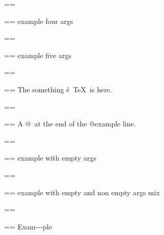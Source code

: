 \documentclass{book}
\makeatletter
\newenvironment{Texinfopreformatted}{%
  \par\GNUTobeylines\obeyspaces\frenchspacing\parskip=\z@\parindent=\z@}{}
{\catcode`\^^M=13 \gdef\GNUTobeylines{\catcode`\^^M=13 \def^^M{\null\par}}}
\newenvironment{Texinfoindented}{\begin{list}{}{}\item\relax}{\end{list}}
\renewcommand{\_}{\Texinfounderscore\discretionary{}{}{}}
\makeatother
\begin{document}
\begin{Texinfoindented}
\begin{Texinfopreformatted}%
\ttfamily 
\end{Texinfopreformatted}
\begin{Texinfoindented}
\begin{Texinfopreformatted}%
\ttfamily example four args
\end{Texinfopreformatted}
\end{Texinfoindented}
\begin{Texinfopreformatted}%
\ttfamily 
\end{Texinfopreformatted}
\begin{Texinfoindented}
\begin{Texinfopreformatted}%
\ttfamily example five args
\end{Texinfopreformatted}
\end{Texinfoindented}
\begin{Texinfopreformatted}%
\ttfamily 
\end{Texinfopreformatted}
\begin{Texinfoindented}
\begin{Texinfopreformatted}%
\ttfamily The something \'{e}\ \TeX{}\ is here.
\end{Texinfopreformatted}
\end{Texinfoindented}
\begin{Texinfopreformatted}%
\ttfamily 
\end{Texinfopreformatted}
\begin{Texinfoindented}
\begin{Texinfopreformatted}%
\ttfamily A @\ at the end of the @example line.
\end{Texinfopreformatted}
\end{Texinfoindented}
\begin{Texinfopreformatted}%
\ttfamily 
\end{Texinfopreformatted}
\begin{Texinfoindented}
\begin{Texinfopreformatted}%
\ttfamily example with empty args
\end{Texinfopreformatted}
\end{Texinfoindented}
\begin{Texinfopreformatted}%
\ttfamily 
\end{Texinfopreformatted}
\begin{Texinfoindented}
\begin{Texinfopreformatted}%
\ttfamily example with empty and non empty args mix
\end{Texinfopreformatted}
\end{Texinfoindented}
\begin{Texinfopreformatted}%
\ttfamily 
\end{Texinfopreformatted}
\begin{Texinfoindented}
\begin{Texinfopreformatted}%
\ttfamily Exam{-}{-}{-}ple


\end{Texinfopreformatted}
\end{Texinfoindented}
\end{Texinfoindented}
\end{document}
